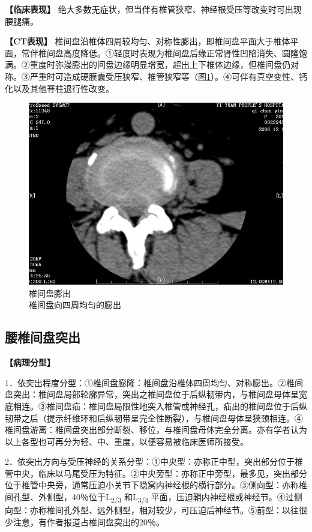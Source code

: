 \textbf{【临床表现】}
绝大多数无症状，但当伴有椎管狭窄、神经根受压等改变时可出现腰腿痛。

\textbf{【CT表现】}
椎间盘沿椎体四周较均匀、对称性膨出，即椎间盘平面大于椎体平面，常伴椎间盘高度降低。①轻度时表现为椎间盘后缘正常肾性凹陷消失、圆隆饱满。②重度时弥漫膨出的间盘边缘明显增宽，超出上下椎体边缘，但椎间盘仍对称。③严重时可造成硬膜囊受压狭窄、椎管狭窄等（图\ref{fig23-6}）。④可伴有真空变性、钙化以及其他脊柱退行性改变。

\begin{figure}[!htbp]
 \centering
 \includegraphics[width=.7\textwidth,height=\textheight,keepaspectratio]{./images/Image00469.jpg}
 \captionsetup{justification=centering}
 \caption{椎间盘膨出\\{\small 椎间盘向四周均匀的膨出}}
 \label{fig23-6}
  \end{figure} 

\subsection{腰椎间盘突出}

\textbf{【病理分型】}

1．依突出程度分型：①椎间盘膨隆：椎间盘沿椎体四周均匀、对称膨出。②椎间盘突出：椎间盘局部轮廓异常，突出之椎间盘位于后纵韧带内，与椎间盘母体呈宽底相连。③椎间盘疝：椎间盘局限性地突入椎管或神经孔，疝出的椎间盘位于后纵韧带之后（提示纤维环和后纵韧带呈完全性断裂），与椎间盘母体呈狭颈相连。④椎间盘游离：椎间盘突出部分断裂、移位，与椎间盘母体完全分离。亦有学者认为以上各型也可再分为轻、中、重度，以便容易被临床医师所接受。

2．依突出方向与受压神经的关系分型：①中央型：亦称正中型，突出部分位于椎管中央，临床以马尾受压为特征。②中央旁型：亦称正中旁型，最多见，突出部分位于椎管中央旁，通常压迫小关节下隐窝内神经根的横行部分。③侧向型：亦称椎间孔型、外侧型，40％位于L\textsubscript{2/3}
和L\textsubscript{3/4}
平面，压迫鞘内神经根或神经节。④过侧向型：亦称椎间孔外型、远外侧型，相对较少，可压迫后神经节。⑤前型：以往很少注意，有作者报道占椎间盘突出的20％。

